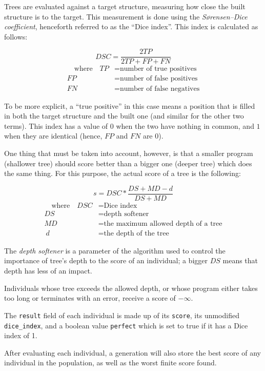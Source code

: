 \documentclass{report}
\begin{document}
Trees are evaluated against a target structure, measuring how close the built structure is to the target. This measurement is done using the \emph{Sørensen–Dice coefficient}\cite{sorensen}\cite{dice}, henceforth referred to as the ``Dice index''. This index is calculated as follows:

$$DSC = \frac{2TP}{2TP + FP + FN}$$
\begin{align*}\quad
    \text{where}\quad
    TP &= \text{number of true positives}\\
    FP &= \text{number of false positives}\\
    FN &= \text{number of false negatives}
\end{align*}

To be more explicit, a ``true positive'' in this case means a position that is filled in both the target structure and the built one (and similar for the other two terms). This index has a value of $0$ when the two have nothing in common, and $1$ when they are identical (hence, $FP$ and $FN$ are $0$).

One thing that must be taken into account, however, is that a smaller program (shallower tree) should score better than a bigger one (deeper tree) which does the same thing. For this purpose, the actual score of a tree is the following:

$$s = DSC * \frac{DS + MD - d}{DS + MD}$$
\begin{align*}\quad
    \text{where}\quad
    DSC &= \text{Dice index}\\
    DS &= \text{depth softener}\\
    MD &= \text{the maximum allowed depth of a tree}\\\
    d &= \text{the depth of the tree}
\end{align*}

The \emph{depth softener} is a parameter of the algorithm  used to control the importance of tree's depth to the score of an individual; a bigger $DS$ means that depth has less of an impact.

Individuals whose tree exceeds the allowed depth, or whose program either takes too long or terminates with an error, receive a score of $-\infty$.

The \verb|result| field of each individual is made up of its \verb|score|, its unmodified \verb|dice_index|, and a boolean value \verb|perfect| which is set to true if it has a Dice index of 1.

After evaluating each individual, a generation will also store the best score of any individual in the population, as well as the worst finite score found.
\end{document}
